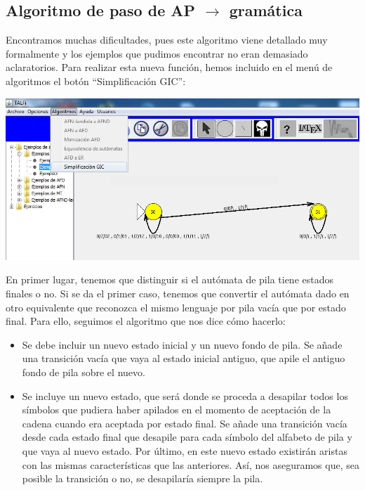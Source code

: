 \documentclass[12pt,a4paper,spanish]{book}
\begin{document}
\subsection{Algoritmo de paso de AP $\rightarrow$ gram\'atica\\}
Encontramos muchas dificultades, pues este algoritmo viene detallado muy formalmente y los ejemplos que pudimos encontrar no eran demasiado aclaratorios.
Para realizar esta nueva funci\'on, hemos incluido en el men\'u de algoritmos el bot\'on ``Simplificaci\'on GIC'':\\
\begin{center}
\includegraphics[width=\textwidth]{auto4.jpg}\newline
\end{center}
En primer lugar, tenemos que distinguir si el aut\'omata de pila tiene estados finales o no. Si se da el primer caso, tenemos que convertir el aut\'omata dado en otro equivalente que reconozca el mismo lenguaje por pila vac\'ia que por estado final. Para ello, seguimos el algoritmo que nos dice c\'omo hacerlo:
\begin{itemize}
\item Se debe incluir un nuevo estado inicial y un nuevo fondo de pila. Se a\~nade una transici\'on vac\'ia que vaya al estado inicial antiguo, que apile el antiguo fondo de pila sobre el nuevo.

\item Se incluye un nuevo estado, que ser\'a donde se proceda a desapilar todos los s\'imbolos que pudiera haber apilados en el momento de aceptaci\'on de la cadena cuando era aceptada por estado final. Se a\~nade una transici\'on vac\'ia desde cada estado final que desapile para cada s\'imbolo del alfabeto de pila y que vaya al nuevo estado. Por \'ultimo, en este nuevo estado existir\'an aristas con las mismas caracter\'isticas que las anteriores. As\'i, nos aseguramos que, sea posible la transici\'on o no, se desapilar\'ia siempre la pila.
\end{itemize}
\end{document}
